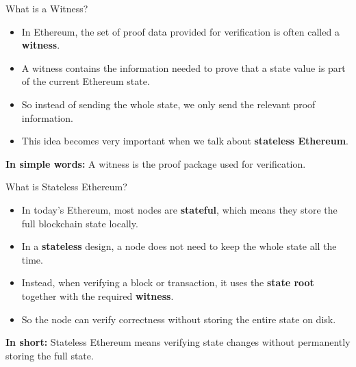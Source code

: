 \documentclass{beamer}
\begin{document}
\begin{frame}{What is a Witness?}
\begin{itemize}
    \item In Ethereum, the set of proof data provided for verification is often called a \textbf{witness}.
    \item A witness contains the information needed to prove that a state value is part of the current Ethereum state.
    \item So instead of sending the whole state, we only send the relevant proof information.
    \item This idea becomes very important when we talk about \textbf{stateless Ethereum}.
\end{itemize}

\vspace{0.3cm}
\textbf{In simple words:} A witness is the proof package used for verification.
\end{frame}

\begin{frame}{What is Stateless Ethereum?}
\begin{itemize}
    \item In today's Ethereum, most nodes are \textbf{stateful}, which means they store the full blockchain state locally.
    \item In a \textbf{stateless} design, a node does not need to keep the whole state all the time.
    \item Instead, when verifying a block or transaction, it uses the \textbf{state root} together with the required \textbf{witness}.
    \item So the node can verify correctness without storing the entire state on disk.
\end{itemize}

\vspace{0.3cm}
\textbf{In short:} Stateless Ethereum means verifying state changes without permanently storing the full state.
\end{frame}
\end{document}
